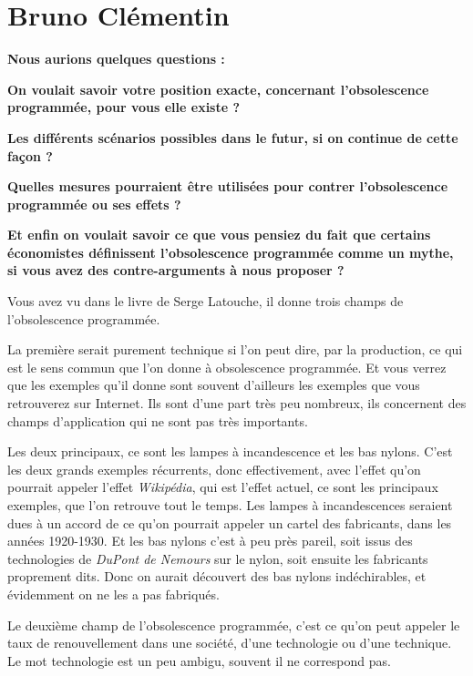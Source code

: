 \section{Bruno Clémentin}
\label{InterviewBClémentin}
\begin{small}


\textbf{Nous aurions quelques questions : }

\textbf{On voulait savoir votre position exacte, concernant l’obsolescence programmée, pour vous elle existe ?}

\textbf{Les différents scénarios possibles dans le futur, si on continue de cette façon ?}

\textbf{Quelles mesures pourraient être utilisées pour contrer l’obsolescence programmée ou ses effets ?}

\textbf{Et enfin on voulait savoir ce que vous pensiez du fait que certains économistes définissent l’obsolescence programmée comme un mythe, si vous avez des contre-arguments à nous proposer ?}

\vspace{1\baselineskip}

Vous avez vu dans le livre de Serge Latouche, il donne trois champs de l'obsolescence programmée.
 
La première serait purement technique si l'on peut dire, par la production, ce qui est le sens commun que l'on donne à obsolescence programmée. Et vous verrez que les exemples qu'il donne sont souvent d'ailleurs les exemples que vous retrouverez sur Internet. Ils sont d'une part très peu nombreux, ils concernent des champs d'application qui ne sont pas très importants.
 
Les deux principaux, ce sont les lampes à incandescence et les bas nylons. C'est les deux grands exemples récurrents, donc effectivement, avec l'effet qu'on pourrait appeler l'effet \textit{Wikipédia}, qui est l'effet actuel, ce sont les principaux exemples, que l'on retrouve tout le temps.
Les lampes à incandescences seraient dues à un accord de ce qu'on pourrait appeler un cartel des fabricants, dans les années 1920-1930.
Et les bas nylons c'est à peu près pareil, soit issus des technologies de \textit{DuPont de Nemours} sur le nylon, soit ensuite les fabricants proprement dits. Donc on aurait découvert des bas nylons indéchirables, et évidemment on ne les a pas fabriqués.

Le deuxième champ de l'obsolescence programmée, c'est ce qu'on peut appeler le taux de renouvellement dans une société, d'une technologie ou d'une technique. Le mot technologie est un peu ambigu, souvent il ne correspond pas.


\end{small}
